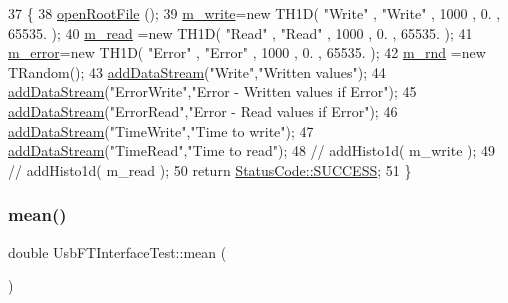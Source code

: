 \begin{DoxyCode}
37                                             \{
38   \hyperlink{classProcessus_aacf6812880c1d1a2bf14a4a39458f443}{openRootFile} ();
39   \hyperlink{classUsbFTInterfaceTest_ab454b0a533694280200f10c97aa99f64}{m\_write}=\textcolor{keyword}{new} TH1D( \textcolor{stringliteral}{"Write"} , \textcolor{stringliteral}{"Write"} , 1000 , 0. , 65535. );
40   \hyperlink{classUsbFTInterfaceTest_a6bb9dcdfe857de2aebcb3e0c11c32167}{m\_read} =\textcolor{keyword}{new} TH1D( \textcolor{stringliteral}{"Read"}  , \textcolor{stringliteral}{"Read"}  , 1000 , 0. , 65535. );
41   \hyperlink{classUsbFTInterfaceTest_ac4efb68232e7acdf1b87278aabfbf1a6}{m\_error}=\textcolor{keyword}{new} TH1D( \textcolor{stringliteral}{"Error"} , \textcolor{stringliteral}{"Error"} , 1000 , 0. , 65535. );
42   \hyperlink{classUsbFTInterfaceTest_af4768c2ff0859d1808fe95cbe125b810}{m\_rnd} =\textcolor{keyword}{new} TRandom();
43   \hyperlink{classProcessus_a308c8f193802f1d1ab49d4447d0cb281}{addDataStream}(\textcolor{stringliteral}{"Write"},\textcolor{stringliteral}{"Written values"});
44   \hyperlink{classProcessus_a308c8f193802f1d1ab49d4447d0cb281}{addDataStream}(\textcolor{stringliteral}{"ErrorWrite"},\textcolor{stringliteral}{"Error - Written values if Error"});
45   \hyperlink{classProcessus_a308c8f193802f1d1ab49d4447d0cb281}{addDataStream}(\textcolor{stringliteral}{"ErrorRead"},\textcolor{stringliteral}{"Error - Read values if Error"});
46   \hyperlink{classProcessus_a308c8f193802f1d1ab49d4447d0cb281}{addDataStream}(\textcolor{stringliteral}{"TimeWrite"},\textcolor{stringliteral}{"Time to write"});
47   \hyperlink{classProcessus_a308c8f193802f1d1ab49d4447d0cb281}{addDataStream}(\textcolor{stringliteral}{"TimeRead"},\textcolor{stringliteral}{"Time to read"});
48   \textcolor{comment}{//  addHisto1d( m\_write );}
49   \textcolor{comment}{//  addHisto1d( m\_read );}
50   \textcolor{keywordflow}{return} \hyperlink{classStatusCode_a6f565cbeadc76d14c72f047e5e85eb4badd0da38d3ba0d922efd1f4619bc37ad8}{StatusCode::SUCCESS};
51 \}
\end{DoxyCode}
\mbox{\label{classUsbFTInterfaceTest_a8b88ab4c18cff5e8da014ef6fcf39b90}} 
\subsubsection{\texorpdfstring{mean()}{mean()}}
{\footnotesize\ttfamily double Usb\+F\+T\+Interface\+Test\+::mean (\begin{DoxyParamCaption}{ }\end{DoxyParamCaption})\hspace{0.3cm}{\ttfamily [inline]}}



